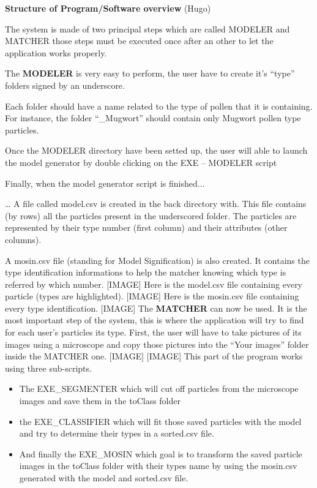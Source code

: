 \textbf{Structure of Program/Software overview} (Hugo) 

The system is made of two principal steps which are called MODELER and MATCHER those steps must be executed once after an other to let the application works properly.

The \textbf{MODELER} is very easy to perform, the user have to create it's “type” folders signed by an underscore.

Each folder should have a name related to the type of pollen that it is containing. For instance, the folder “\_Mugwort” should contain only Mugwort pollen type particles.

Once the MODELER directory have been setted up, the user will able to launch the model generator by double clicking on the EXE – MODELER script

Finally, when the model generator script is finished...

… A file called model.csv is created in the back directory with. This file contains (by rows) all the particles present in the underscored folder. The particles are represented by their type number (first column) and their attributes (other columns).

A mosin.csv file (standing for Model Signification) is also created. It contains the type identification informations to help the matcher knowing which type is referred by which number.
[IMAGE]
Here is the model.csv file containing every particle (types are highlighted).
[IMAGE]
Here is the mosin.csv file containing every type identification.
[IMAGE]
The \textbf{MATCHER} can now be used. It is the most important step of the system, this is where the application will try to find for each user's particles its type.
First, the user will have to take pictures of its images using a microscope and copy those pictures into the “Your images” folder inside the MATCHER one.
[IMAGE]
[IMAGE]
This part of the program works using three sub-scripts.

\begin{itemize}
\item The EXE\_SEGMENTER which will cut off particles from the microscope images and save them in the toClass folder

\item the EXE\_CLASSIFIER which will fit those saved particles with the model and try to determine their types in a sorted.csv file.

\item And finally the EXE\_MOSIN which goal is to transform the saved particle images in the toClass folder with their types name by using the mosin.csv generated with the model and sorted.csv file.
\end{itemize}

